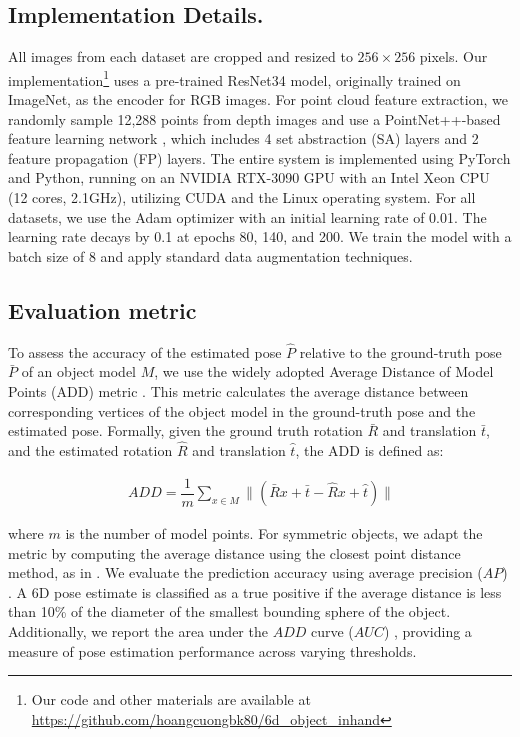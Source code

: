 \subsection{\textbf{Implementation Details.}}

All images from each dataset are cropped and resized to $256 \times 256$ pixels. Our implementation\footnote{Our code and other materials are available at \url{https://github.com/hoangcuongbk80/6d_object_inhand}} uses a pre-trained ResNet34 model, originally trained on ImageNet, as the encoder for RGB images. For point cloud feature extraction, we randomly sample 12,288 points from depth images and use a PointNet++-based feature learning network \cite{qi2017pointnet++}, which includes 4 set abstraction (SA) layers and 2 feature propagation (FP) layers. The entire system is implemented using PyTorch and Python, running on an NVIDIA RTX-3090 GPU with an Intel Xeon CPU (12 cores, 2.1GHz), utilizing CUDA and the Linux operating system. For all datasets, we use the Adam optimizer with an initial learning rate of 0.01. The learning rate decays by 0.1 at epochs 80, 140, and 200. We train the model with a batch size of 8 and apply standard data augmentation techniques.

\subsection{Evaluation metric}
\label{sec:metric}

To assess the accuracy of the estimated pose $\hat{P}$ relative to the ground-truth pose $\bar{P}$ of an object model $M$, we use the widely adopted Average Distance of Model Points (ADD) metric \cite{hinterstoisser2012model}. This metric calculates the average distance between corresponding vertices of the object model in the ground-truth pose and the estimated pose. Formally, given the ground truth rotation $\bar{R}$ and translation $\bar{t}$, and the estimated rotation $\hat{R}$ and translation $\hat{t}$, the ADD is defined as:

\begin{align}
\  ADD = \dfrac{1}{m} \sum_{x \in M} \parallel (\bar{R}x+ \bar{t} - \hat{R}x+ \hat{t}) \parallel
\end{align}

\noindent where $m$ is the number of model points. For symmetric objects, we adapt the metric by computing the average distance using the closest point distance method, as in \cite{bregier2017symmetry}. We evaluate the prediction accuracy using average precision ($AP$) \cite{bregier2017symmetry}. A 6D pose estimate is classified as a true positive if the average distance is less than 10\% of the diameter of the smallest bounding sphere of the object. Additionally, we report the area under the $ADD$ curve ($AUC$) \cite{wang2019densefusion}, providing a measure of pose estimation performance across varying thresholds.

